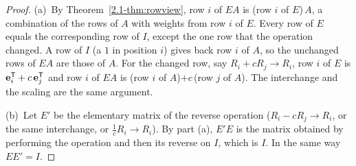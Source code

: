 \documentclass[11pt]{article}
\begin{document}
\begin{proof}
(a)~By Theorem~\ref{2.1-thm:rowview}, row $i$ of $EA$ is (row $i$ of $E$)$\,A$, a combination of the rows of $A$ with weights from row $i$ of $E$. Every row of $E$ equals the corresponding row of $I$, except the one row that the operation changed. A row of $I$ (a $1$ in position $i$) gives back row $i$ of $A$, so the unchanged rows of $EA$ are those of $A$. For the changed row, say $R_i+cR_j\to R_i$, row $i$ of $E$ is $\mathbf{e}_i^{\mathsf T}+c\,\mathbf{e}_j^{\mathsf T}$ and row $i$ of $EA$ is (row $i$ of $A$)$+c\,$(row $j$ of $A$). The interchange and the scaling are the same argument.

(b)~Let $E'$ be the elementary matrix of the reverse operation ($R_i-cR_j\to R_i$, or the same interchange, or $\tfrac1cR_i\to R_i$). By part (a), $E'E$ is the matrix obtained by performing the operation and then its reverse on $I$, which is $I$. In the same way $EE'=I$.
\end{proof}

\begin{center}
\end{center}
\end{document}
